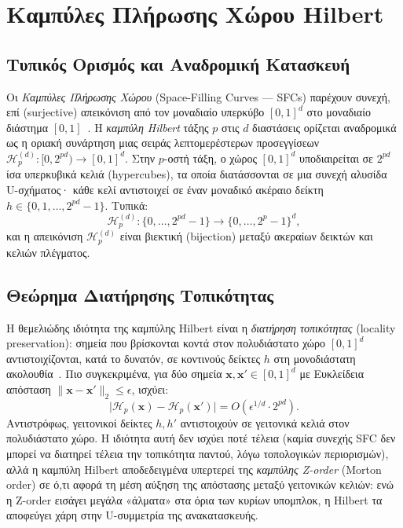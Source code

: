 \section{Καμπύλες Πλήρωσης Χώρου Hilbert}
\label{sec:bg_hilbert}

\subsection*{Τυπικός Ορισμός και Αναδρομική Κατασκευή}

Οι \textit{Καμπύλες Πλήρωσης Χώρου} (Space-Filling Curves --- SFCs) παρέχουν συνεχή, επί (surjective) απεικόνιση από τον μοναδιαίο υπερκύβο $[0,1]^d$ στο μοναδιαίο διάστημα $[0,1]$~\cite{sagan1994space}. Η \textit{καμπύλη Hilbert} τάξης $p$ στις $d$ διαστάσεις ορίζεται αναδρομικά ως η οριακή συνάρτηση μιας σειράς λεπτομερέστερων προσεγγίσεων $\mathcal{H}_p^{(d)} : [0, 2^{pd})\to [0,1]^d$. Στην $p$-οστή τάξη, ο χώρος $[0,1]^d$ υποδιαιρείται σε $2^{pd}$ ίσα υπερκυβικά κελιά (hypercubes), τα οποία διατάσσονται σε μια συνεχή αλυσίδα U-σχήματος· κάθε κελί αντιστοιχεί σε έναν μοναδικό ακέραιο δείκτη $h \in \{0, 1, \ldots, 2^{pd}-1\}$. Τυπικά:
\begin{equation}
    \mathcal{H}_p^{(d)} : \{0,\ldots,2^{pd}-1\} \to \{0,\ldots,2^p-1\}^d,
\end{equation}
και η απεικόνιση $\mathcal{H}_p^{(d)}$ είναι βιεκτική (bijection) μεταξύ ακεραίων δεικτών και κελιών πλέγματος.

\subsection*{Θεώρημα Διατήρησης Τοπικότητας}

Η θεμελιώδης ιδιότητα της καμπύλης Hilbert είναι η \textit{διατήρηση τοπικότητας} (locality preservation): σημεία που βρίσκονται κοντά στον πολυδιάστατο χώρο $[0,1]^d$ αντιστοιχίζονται, κατά το δυνατόν, σε κοντινούς δείκτες $h$ στη μονοδιάστατη ακολουθία~\cite{lawder2000spacefilling, sagan1994space}. Πιο συγκεκριμένα, για δύο σημεία $\bm{x}, \bm{x}' \in [0,1]^d$ με Ευκλείδεια απόσταση $\|\bm{x} - \bm{x}'\|_2 \leq \epsilon$, ισχύει:
\begin{equation}
    \bigl|\mathcal{H}_p(\bm{x}) - \mathcal{H}_p(\bm{x}')\bigr| = O\!\left(\epsilon^{1/d} \cdot 2^{pd}\right).
\end{equation}
Αντιστρόφως, γειτονικοί δείκτες $h, h'$ αντιστοιχούν σε γειτονικά κελιά στον πολυδιάστατο χώρο. Η ιδιότητα αυτή δεν ισχύει ποτέ τέλεια (καμία συνεχής SFC δεν μπορεί να διατηρεί τέλεια την τοπικότητα παντού, λόγω τοπολογικών περιορισμών), αλλά η καμπύλη Hilbert αποδεδειγμένα υπερτερεί της \textit{καμπύλης Z-order} (Morton order) σε ό,τι αφορά τη μέση αύξηση της απόστασης μεταξύ γειτονικών κελιών: ενώ η Z-order εισάγει μεγάλα «άλματα» στα όρια των κυρίων υπομπλοκ, η Hilbert τα αποφεύγει χάρη στην U-συμμετρία της ανακατασκευής.

